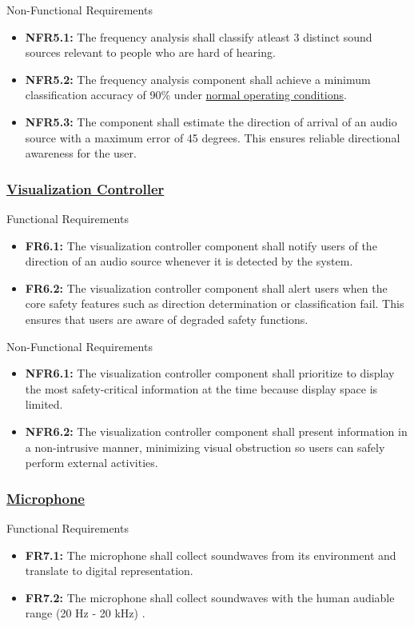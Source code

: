 \documentclass[12pt]{article}
\theoremstyle{definition}
\begin{document}
Non-Functional Requirements
\begin{itemize}
  \item \label{NFR5_1}\textbf{NFR5.1:} The frequency analysis shall classify
  atleast 3 distinct sound sources relevant to people who are hard of hearing.

  \item \label{NFR5_2}\textbf{NFR5.2:} The frequency analysis component shall
  achieve a minimum classification accuracy of 90\% under
  \hyperref[def:normal_operation_condition]{normal operating conditions}.

  \item \label{NFR5_3}\textbf{NFR5.3:} The component shall estimate the
  direction of arrival of an audio source with a maximum error of 45 degrees.
  This ensures reliable directional awareness for the user.
\end{itemize}

\subsubsection{\hyperref[comp:viz_controller]{Visualization Controller}}
Functional Requirements
\begin{itemize}
  \item \label{FR6_1}\textbf{FR6.1:} The visualization controller component
  shall notify users of the direction of an audio source whenever it is
  detected by the system.

  \item \label{FR6_2}\textbf{FR6.2:} The visualization controller component
  shall alert users when the core safety features such as direction
  determination or classification fail. This ensures that users are aware of
  degraded safety functions.
\end{itemize}

Non-Functional Requirements
\begin{itemize}
  \item \label{NFR6_1}\textbf{NFR6.1:} The visualization controller component
  shall prioritize to display the most safety-critical information at the
  time because display space is limited.
  \item \label{NFR6_2}\textbf{NFR6.2:} The visualization controller component
  shall present information in a non-intrusive manner, minimizing visual
  obstruction so users can safely perform external activities.
\end{itemize}

\subsubsection{\hyperref[comp:microphone]{Microphone}}
Functional Requirements
\begin{itemize}
  \item \label{FR7_1}\textbf{FR7.1:} The microphone shall collect soundwaves
  from its environment and translate to digital representation.

  \item \label{FR7_2}\textbf{FR7.2:} The microphone shall collect soundwaves
  with the human audiable range (20 Hz - 20 kHz) \cite{Neuroscience2001}.
\end{itemize}
\end{document}
